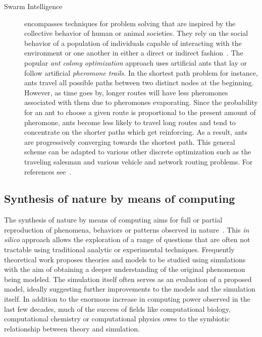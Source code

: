 \begin{description}
			\item[Swarm Intelligence] encompasses techniques for problem solving that are inspired by the collective behavior of human or animal societies. They rely on the social behavior of a population of individuals capable of interacting with the environment or one another in either a direct or indirect fashion~\cite{de2007fundamentals}. The popular \emph{ant colony optimization} approach uses artificial ants that lay or follow artificial \emph{pheromone trails}. In the shortest path problem for instance, ants travel all possible paths between two distinct nodes at the beginning. However, as time goes by, longer routes will have less pheromones associated with them due to pheromones evaporating. Since the probability for an ant to choose a given route is proportional to the present amount of pheromone, ants become less likely to travel long routes and tend to concentrate on the shorter paths which get reinforcing. As a result, ants are progressively converging towards the shortest path. This general scheme can be adapted to various other discrete optimization such as the traveling salesman and various vehicle and network routing problems. For references see~\cite{bonabeau2000swarm,bonabeau2000inspiration,Bonabeau:1999:SIN:328320,fukuyama2008fundamentals}.
			
		\end{description}

	\subsection{Synthesis of nature by means of computing}
		
		The synthesis of nature by means of computing aims for full or partial reproduction of phenomena, behaviors or patterns observed in nature~\cite{de2007fundamentals}. This \emph{in silico} approach allows the exploration of a range of questions that are often not tractable using traditional analytic or experimental techniques. Frequently theoretical work proposes theories and models to be studied using simulations with the aim of obtaining a deeper understanding of the original phenomenon being modeled. The simulation itself often serves as an evaluation of a proposed model, ideally suggesting further improvements to the models and the simulation itself. In addition to the enormous increase in computing power observed in the last few decades, much of the success of fields like computational biology, computational chemistry or computational physics owes to the symbiotic relationship between theory and simulation.

